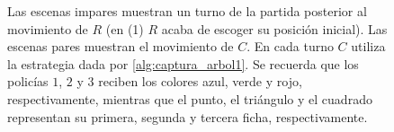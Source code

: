 \begin{figure}[ht!]
\begin{tcbitemize}
{
                }
    \end{tcbitemize}
    \captionsetup{font=footnotesize}
    \caption{Las escenas impares muestran un turno de la partida posterior al
    movimiento de $R$ (en (1) $R$ acaba de escoger su posici\'on inicial). Las
    escenas pares muestran el movimiento de $C$. En cada turno $C$ utiliza la
    estrategia dada por \cref{alg:captura_arbol1}. Se recuerda que los
    polic\'ias $1$, $2$ y $3$ reciben los colores azul, verde y rojo,
    respectivamente, mientras que el punto, el tri\'angulo y el cuadrado
    representan su primera, segunda y tercera ficha, respectivamente.}
    \label{fig:partida2}
\end{figure}

